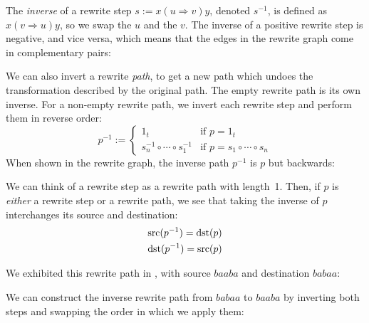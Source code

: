\documentclass[../generics]{subfiles}
\begin{document}
\begin{definition}
The \emph{inverse} of a rewrite step $s:=x(u\Rightarrow v)y$, denoted $s^{-1}$, is defined as $x(v\Rightarrow u)y$, so we swap the $u$ and the $v$. The inverse of a positive rewrite step is negative, and vice versa, which means that the edges in the rewrite graph come in complementary pairs:
\begin{center}
\end{center}

We can also invert a rewrite \emph{path}, to get a new path which undoes the transformation described by the original path. The empty rewrite path is its own inverse. For a non-empty rewrite path, we invert each rewrite step and perform them in reverse order:
\[p^{-1}:=\begin{cases}
1_t&\text{if $p=1_t$}\\
s_n^{-1}\circ\cdots\circ s_1^{-1}&\text{if $p=s_1\circ\cdots\circ s_n$}
\end{cases}
\]
When shown in the rewrite graph, the inverse path $p^{-1}$ is $p$ but backwards:
\begin{center}
\end{center}
\end{definition}

We can think of a rewrite step as a rewrite path with length~1. Then, if $p$ is \emph{either} a rewrite step or a rewrite path, we see that taking the inverse of $p$ interchanges its source and destination:
\begin{gather*}
\operatorname{src}(p^{-1})=\operatorname{dst}(p)\\
\operatorname{dst}(p^{-1})=\operatorname{src}(p)
\end{gather*}

\begin{example}\label{bicyclic 3}
We exhibited this rewrite path in , with source $baaba$ and destination $babaa$:
\begin{center}
\end{center}
We can construct the inverse rewrite path from $babaa$ to $baaba$ by inverting both steps and swapping the order in which we apply them:
\begin{center}
\end{center}
\end{example}
\end{document}
